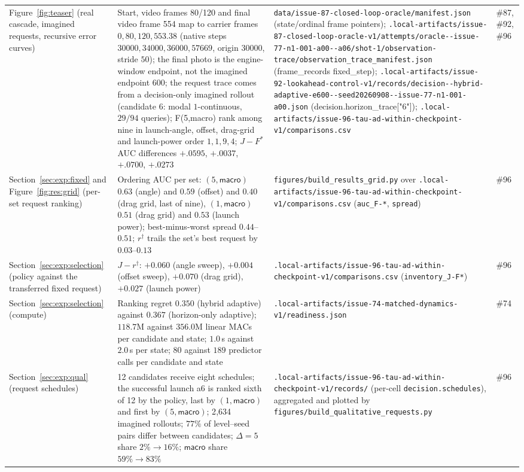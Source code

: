 {\begin{longtable}{@{}p{}p{}p{}p{}@{}}
Figure~\ref{fig:teaser} (real cascade, imagined requests, recursive error curves) & Start, video frames 80/120 and final video frame 554 map to carrier frames $0,80,120,553.38$ (native steps $30000,34000,36000,57669$, origin $30000$, stride $50$); the final photo is the engine-window endpoint, not the imagined endpoint $600$; the request trace comes from a decision-only imagined rollout (candidate 6: modal $1$-continuous, $29/94$ queries); F(5,macro) rank among nine in launch-angle, offset, drag-grid and launch-power order $1,1,9,4$; $J-F^{*}$ AUC differences $+.0595$, $+.0037$, $+.0700$, $+.0273$ & \nolinkurl{data/issue-87-closed-loop-oracle/manifest.json} (state/ordinal frame pointers); \nolinkurl{.local-artifacts/issue-87-closed-loop-oracle-v1/attempts/oracle--issue-77-n1-001-a00--a06/shot-1/observation-trace/observation_trace_manifest.json} (frame\_records fixed\_step); \nolinkurl{.local-artifacts/issue-92-lookahead-control-v1/records/decision--hybrid-adaptive-e600--seed20260908--issue-77-n1-001-a00.json} (decision.horizon\_trace["6"]); \nolinkurl{.local-artifacts/issue-96-tau-ad-within-checkpoint-v1/comparisons.csv} & \#87, \#92, \#96 \\
Section~\ref{sec:exp:fixed} and Figure~\ref{fig:res:grid} (per-set request ranking) & Ordering AUC per set: $(5,\textsf{macro})$ $0.63$ (angle) and $0.59$ (offset) and $0.40$ (drag grid, last of nine), $(1,\textsf{macro})$ $0.51$ (drag grid) and $0.53$ (launch power); best-minus-worst spread $0.44$--$0.51$; $r^\dagger$ trails the set's best request by $0.03$--$0.13$ & \nolinkurl{figures/build_results_grid.py} over \nolinkurl{.local-artifacts/issue-96-tau-ad-within-checkpoint-v1/comparisons.csv} (\texttt{auc\_F-*}, \texttt{spread}) & \#96 \\
Section~\ref{sec:exp:selection} (policy against the transferred fixed request) & $J-r^{\dagger}$: $+0.060$ (angle sweep), $+0.004$ (offset sweep), $+0.070$ (drag grid), $+0.027$ (launch power) & \nolinkurl{.local-artifacts/issue-96-tau-ad-within-checkpoint-v1/comparisons.csv} (\texttt{inventory\_J-F*}) & \#96 \\
Section~\ref{sec:exp:selection} (compute) & Ranking regret $0.350$ (hybrid adaptive) against $0.367$ (horizon-only adaptive); $118.7$M against $356.0$M linear MACs per candidate and state; $1.0$\,s against $2.0$\,s per state; $80$ against $189$ predictor calls per candidate and state & \nolinkurl{.local-artifacts/issue-74-matched-dynamics-v1/readiness.json} & \#74 \\
Section~\ref{sec:exp:qual} (request schedules) & 12 candidates receive eight schedules; the successful launch a6 is ranked sixth of 12 by the policy, last by $(1,\textsf{macro})$ and first by $(5,\textsf{macro})$; 2{,}634 imagined rollouts; $77\%$ of level--seed pairs differ between candidates; $\Delta=5$ share $2\%\to16\%$; $\textsf{macro}$ share $59\%\to83\%$ & \nolinkurl{.local-artifacts/issue-96-tau-ad-within-checkpoint-v1/records/} (per-cell \texttt{decision.schedules}), aggregated and plotted by \nolinkurl{figures/build_qualitative_requests.py} & \#96 \\

\end{longtable}}
